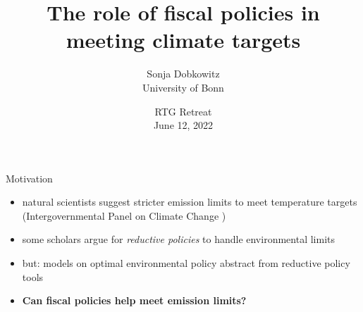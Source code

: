 \documentclass[11pt,aspectratio=169]{beamer}
\author[Sonja Dobkowitz]{\small Sonja Dobkowitz\\ \footnotesize{University of Bonn%
	}\\ }
\title{The role of fiscal policies in meeting climate targets}
\date{\small{RTG Retreat\\ June 12, 2022 }}
\begin{document}
	
	{
		\begin{frame}
		\titlepage
	\end{frame}
}



\addtocounter{framenumber}{-1}
\begin{frame}{Motivation}

\begin{itemize}[<+-| alert@+>]
	\item 	natural scientists suggest stricter emission limits to meet temperature targets \\ \small{(Intergovernmental Panel on Climate Change \citep{Rogelj2018MitigationDevelopment., IPCC2022})}
\vspace{3mm}
	\item some scholars argue for \textit{reductive policies} to handle environmental limits\\ \small{\citep{Schor2005SustainableReduction, Arrow2004AreMuch, Dasgupta2021}}
	\vspace{3mm}
	\item but: models on optimal environmental policy abstract from reductive policy tools %
	\vspace{3mm}
\item \textbf{Can fiscal policies help meet emission limits?}
\end{itemize}
\end{frame}
\end{document}
